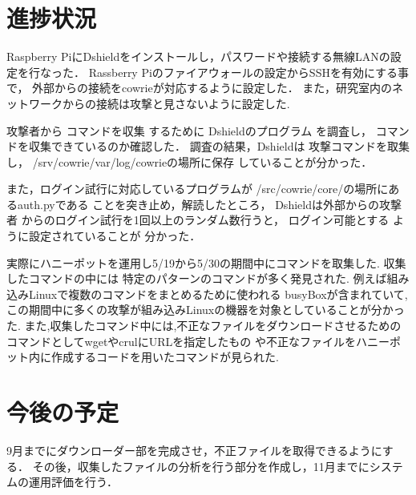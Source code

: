 \documentclass{entry}
\begin{document}
\section{進捗状況}

Raspberry PiにDshieldをインストールし，パスワードや接続する無線LANの設定を行なった．
Rassberry Piのファイアウォールの設定からSSHを有効にする事で，
外部からの接続をcowrieが対応するように設定した．
また，研究室内のネットワークからの接続は攻撃と見さないように設定した.


攻撃者から
コマンドを収集
するために
Dshieldのプログラム
を調査し，
コマンドを収集できているのか確認した．
調査の結果，Dshieldは
攻撃コマンドを取集し，
/srv/cowrie/var/log/cowrieの場所に保存
していることが分かった．

また，ログイン試行に対応しているプログラムが
/src/cowrie/core/の場所にあるauth.pyである
ことを突き止め，解読したところ，
Dshieldは外部からの攻撃者
からのログイン試行を1回以上のランダム数行うと，
ログイン可能とする
ように設定されていることが
分かった．


実際にハニーポットを運用し5/19から5/30の期間中にコマンドを取集した.
収集したコマンドの中には
特定のパターンのコマンドが多く発見された.
例えば組み込みLinuxで複数のコマンドをまとめるために使われる
busyBoxが含まれていて,
この期間中に多くの攻撃が組み込みLinuxの機器を対象としていることが分かった.
また,収集したコマンド中には,不正なファイルをダウンロードさせるための
コマンドとしてwgetやcrulにURLを指定したもの
や不正なファイルをハニーポット内に作成するコードを用いたコマンドが見られた.


\section{今後の予定}

9月までにダウンローダー部を完成させ，不正ファイルを取得できるようにする．
その後，収集したファイルの分析を行う部分を作成し，11月までにシステムの運用評価を行う．



%

\end{document}
